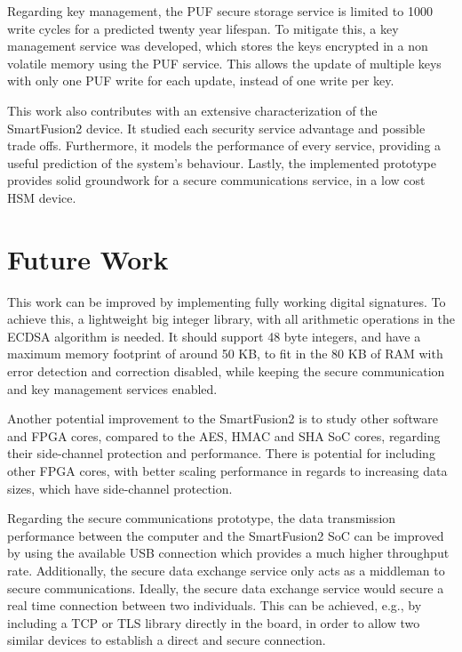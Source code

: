Regarding key management, the PUF secure storage service is limited to 1000 write cycles for a predicted twenty year lifespan. To mitigate this, a key management service was developed, which stores the keys encrypted in a non volatile memory using the PUF service. This allows the update of multiple keys with only one PUF write for each update, instead of one write per key.

This work also contributes with an extensive characterization of the SmartFusion2 device. It studied each security service advantage and possible trade offs. Furthermore, it models the performance of every service, providing a useful prediction of the system's behaviour. Lastly, the implemented prototype provides solid groundwork for a secure communications service, in a low cost HSM device.

\section{Future Work} \label{chap:conclusion:future-work}

This work can be improved by implementing fully working digital signatures. To achieve this, a lightweight big integer library, with all arithmetic operations in the ECDSA algorithm is needed. It should support 48 byte integers, and have a maximum memory footprint of around 50 KB, to fit in the 80 KB of RAM with error detection and correction disabled, while keeping the secure communication and key management services enabled.

Another potential improvement to the SmartFusion2 is to study other software and FPGA cores, compared to the AES, HMAC and SHA SoC cores, regarding their side-channel protection and performance. There is potential for including other FPGA cores, with better scaling performance in regards to increasing data sizes, which have side-channel protection.

Regarding the secure communications prototype, the data transmission performance between the computer and the SmartFusion2 SoC can be improved by using the available USB connection which provides a much higher throughput rate.
Additionally, the secure data exchange service only acts as a middleman to secure communications. Ideally, the secure data exchange service would secure a real time connection between two individuals. This can be achieved, e.g., by including a TCP or TLS library directly in the board, in order to allow two similar devices to establish a direct and secure connection.

